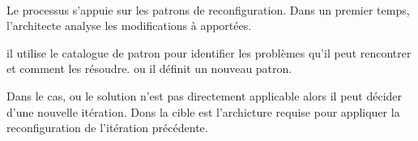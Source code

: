 \paragraph{}
Le processus s'appuie sur les patrons de reconfiguration. Dans un
premier temps, l'architecte analyse les modifications à apportées. 

il utilise le catalogue de patron pour identifier les problèmes qu'il
peut rencontrer et comment les résoudre. ou il définit un nouveau
patron. 

Dans le cas, ou le solution n'est pas directement applicable alors il
peut décider d'une nouvelle itération. Dons la cible est l'archicture
requise pour appliquer la reconfiguration de l'itération précédente. 



